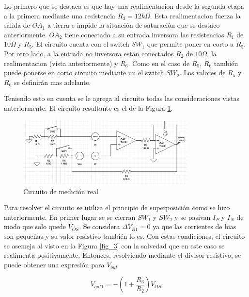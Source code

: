 \documentclass[12pt,a4paper]{article}
\begin{document}
Lo primero que se destaca es que hay una realimentacion desde la segunda etapa a la primera mediante una resistencia $R_3 = 12k\Omega$. Esta realimentacion fuerza la salida de $OA_1$ a tierra e impide la situación de saturación que se destaco
anteriormente.  $OA_2$ tiene conectado a su entrada inversora las resistencias $R_1$ de $10\Omega$ y $R_5$. El circuito cuenta con el switch $SW_1$ que permite poner en corto a $R_5$. Por otro lado,
a la entrada no inversora estan conectados $R_2$ de $10\Omega$, la realimentacion (vista anteriormente) y $R_6$. Como en el caso de $R_5$, $R_6$ también puede
ponerse en corto circuito mediante un el switch $SW_2$. Los valores de $R_5$ y $R_6$ se definirán mas adelante. 

Teniendo esto en cuenta se le agrega al circuito todas las consideraciones vistas anteriormente. El circuito resultante es el de la Figura \ref{medicion_real}.

\begin{figure}[ht]                                                       
    \centering\includegraphics[width=0.8\textwidth]{Figuras/fig_8.png}
     \caption{Circuito de medición real}
     \label{medicion_real}
     \end{figure}

Para resolver el circuito se utiliza el principio de superposición como se hizo anteriormente. En primer lugar se se cierran $SW_1$ y $SW_2$ y se pasivan $I_P$ y $I_N$ de modo que solo quede $V_{OS}$.
Se considera $\Delta V_{R1} = 0$ ya que las corrientes de bias son pequeñas y su valor resistivo también lo es. Con estas condiciones, el circuito se asemeja al visto en la Figura \ref{fig_3} con la salvedad que en este caso se realimenta positivamente. Entonces, resolviendo
mediante el divisor resistivo, se puede obtener una expresión para $V_{out}$

\begin{equation} V_{out1} = -(1 + \frac{R_3}{R_2})V_{OS} \label{ecuacion_Vout_1}\end{equation}
\end{document}
